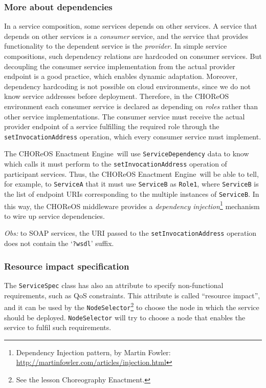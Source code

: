 \documentclass[a4paper, 10pt]{article}
\newcommand{\ee}{CHOReOS Enactment Engine}
\begin{document}
\subsubsection*{More about dependencies}

In a service composition, some services depends on other services. A service that depends on other services is a \emph{consumer} service, and the service that provides functionality to the dependent service is the \emph{provider}. In simple service compositions, such dependency relations are hardcoded on consumer services. But decoupling the consumer service implementation from the actual provider endpoint is a good practice, which enables dynamic adaptation. Moreover, dependency hardcoding is not possible on cloud environments, since we do not know service addresses before deployment. Therefore, in the CHOReOS environment each consumer service is declared as depending on \emph{roles} rather than other service implementations. The consumer service must receive the actual provider endpoint of a service fulfilling the required role through the \verb!setInvocationAddress! operation, which every consumer service must implement.  

The \ee\ will use \verb!ServiceDependency! data to know which calls it must perform to the  \verb!setInvocationAddress! operation of participant services. Thus, the \ee\ will be able to tell, for example, to \verb!ServiceA! that it must use \verb!ServiceB! as \verb!Role1!, where \verb!ServiceB! is the list of endpoint URIs corresponding to the multiple instances of \verb!ServiceB!. In this way, the CHOReOS middleware provides a \emph{dependency injection}\footnote{Dependency Injection pattern, by Martin Fowler: \url{http://martinfowler.com/articles/injection.html}} mechanism to wire up service dependencies.

\emph{Obs:} to SOAP services, the URI passed to the \texttt{setInvocationAddress} operation does not contain the `\texttt{?wsdl}' suffix.

\subsubsection*{Resource impact specification}

The \verb!ServiceSpec! class has also an attribute to specify non-functional requirements, such as QoS constraints. This attribute is called ``resource impact'', and it can be used by the \verb!NodeSelector!\footnote{See the lesson Choreography Enactment.} to choose the node in which the service should be deployed. \verb!NodeSelector! will try to choose a node that enables the service to fulfil such requirements.
\end{document}
